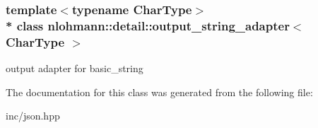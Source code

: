 \subsubsection*{template$<$typename Char\+Type$>$\\*
class nlohmann\+::detail\+::output\+\_\+string\+\_\+adapter$<$ Char\+Type $>$}

output adapter for basic\+\_\+string 

The documentation for this class was generated from the following file\+:\begin{DoxyCompactItemize}
\item 
inc/json.\+hpp\end{DoxyCompactItemize}
